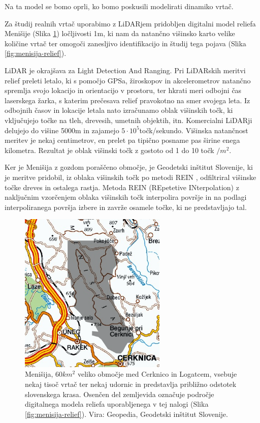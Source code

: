 \documentclass[a4paper, twoside, 12pt]{book}
\begin{document}
Na ta model se bomo oprli, ko bomo poskusili modelirati dinamiko vrtač.

  Za študij realnih vrtač uporabimo z LiDARjem pridobljen digitalni model reliefa Menišije (Slika \ref{fig:menisija-karta}) ločljivosti 1m, ki nam da natančno višinsko karto velike količine vrtač ter omogoči zanesljivo identifikacijo in študij tega pojava (Slika \ref{fig:menisija-relief}).

  LiDAR je okrajšava za Light Detection And Ranging. Pri LiDARskih meritvi relief preleti letalo, ki s pomočjo GPSa, žiroskopov in akcelerometrov natančno spremlja svojo lokacijo in orientacijo v prostoru, ter hkrati meri odbojni čas laserskega žarka, s katerim prečesava relief pravokotno na smer svojega leta. Iz odbojnih časov in lokacije letala nato izračunamo oblak višinskih točk, ki vključujejo točke na tleh, drevesih, umetnih objektih, itn. Komercialni LiDARji delujejo do višine 5000m in zajamejo $5 \cdot 10^5$točk/sekundo. Višinska natančnost meritev je nekaj centimetrov, en prelet pa tipično posname pas širine enega kilometra. Rezultat je oblak višinski točk z gostoto od 1 do 10 točk $/ m^2$.

  Ker je Menišija z gozdom poraščeno območje, je Geodetski inštitut Slovenije, ki je meritve pridobil, iz oblaka višinskih točk po metodi REIN \cite{Kobler20079}, odfiltriral višinske točke dreves in ostalega rastja. Metoda REIN (REpetetive INterpolation) z naključnim vzorčenjem oblaka višinskih točk interpolira površje in na podlagi interpoliranega površja izbere in zavrže osamele točke, ki ne predstavljajo tal.

  \begin{figure}[h]
    \begin{center}
      \includegraphics[width=7cm]{slike/menisija-karta}
    \end{center}
    \caption{Menišija, $60 km^2$ veliko območje med Cerknico in Logatcem, vsebuje nekaj tisoč vrtač ter nekaj udornic in predstavlja približno odstotek slovenskega krasa. Osenčen del zemljevida označuje področje digitalnega modela reliefa uporabljenega v tej nalogi (Slika \ref{fig:menisija-relief}). Vira: Geopedia, Geodetski inštitut Slovenije.}
    \label{fig:menisija-karta}
  \end{figure}
\end{document}
